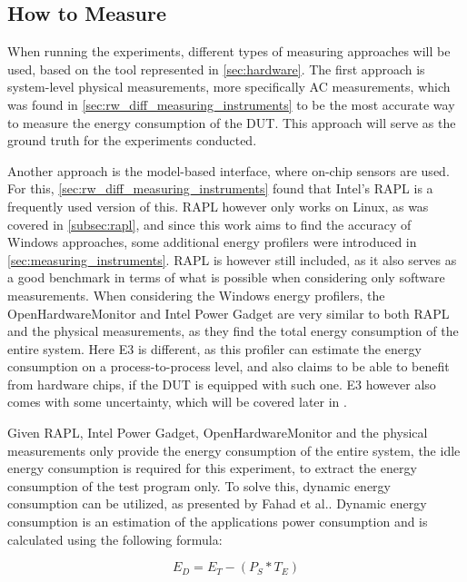 \subsection{How to Measure}\label{subsec:how_to_measure}

When running the experiments, different types of measuring approaches will be used, based on the tool represented in \cref*{sec:hardware}. The first approach is system-level physical measurements, more specifically AC measurements, which was found in \cref*{sec:rw_diff_measuring_instruments} to be the most accurate way to measure the energy consumption of the DUT. This approach will serve as the ground truth for the experiments conducted.

Another approach is the model-based interface, where on-chip sensors are used. For this, \cref*{sec:rw_diff_measuring_instruments} found that Intel's RAPL is a frequently used version of this. RAPL however only works on Linux, as was covered in \cref*{subsec:rapl}, and since this work aims to find the accuracy of Windows approaches, some additional energy profilers were introduced in \cref*{sec:measuring_instruments}. RAPL is however still included, as it also serves as a good benchmark in terms of what is possible when considering only software measurements. When considering the Windows energy profilers, the OpenHardwareMonitor and Intel Power Gadget are very similar to both RAPL and the physical measurements, as they find the total energy consumption of the entire system. Here E3 is different, as this profiler can estimate the energy consumption on a process-to-process level, and also claims to be able to benefit from hardware chips, if the DUT is equipped with such one.\cite*{E3WinHec} E3 however also comes with some uncertainty, which will be covered later in .

Given RAPL, Intel Power Gadget, OpenHardwareMonitor and the physical measurements only provide the energy consumption of the entire system, the idle energy consumption is required for this experiment, to extract the energy consumption of the test program only. To solve this, dynamic energy consumption can be utilized, as presented by Fahad et al.\cite*[]{fahad2019comparative}. Dynamic energy consumption is an estimation of the applications power consumption and is calculated using the following formula:

\begin{equation}
    E_D = E_T -(P_S * T_E)
\end{equation}


